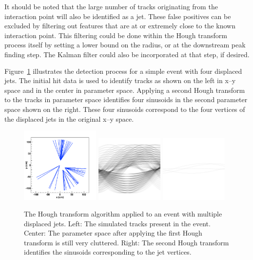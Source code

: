 \documentclass[preprint,sort&compress]{elsarticle}
\begin{document}
It should be noted that the large number of tracks originating from the interaction point will also be identified as a jet.  These false positives can be excluded by filtering out features that are at or extremely close to the known interaction point.  This filtering could be done within the Hough transform process itself by setting a lower bound on the radius, or at the downstream peak finding step. The Kalman filter could also be incorporated at that step, if desired.

Figure~\ref{fig:DisplacedJets} illustrates the detection process for a simple event with four displaced jets.  The initial hit data is used to identify tracks as shown on the left in x--y space and in the center in parameter space.  Applying a second Hough transform to the tracks in parameter space identifies four sinusoids in the second parameter space shown on the right.  These four sinusoids correspond to the four vertices of the displaced jets in the original x--y space.

\begin{figure}[!Hhtb]
\begin{center}
	\includegraphics[width=0.35\textwidth]{tracks.pdf}
	\includegraphics[width=0.30\textwidth]{accumulator.pdf}
	\includegraphics[width=0.30\textwidth]{vertex.pdf}
	\caption{The Hough transform algorithm applied to an event with multiple displaced jets. Left: The simulated
	tracks present in the event. Center: The parameter space after applying the first Hough transform is still very
	cluttered. Right: The second Hough transform identifies the sinusoids corresponding to the jet vertices.
	\label{fig:DisplacedJets}}
\end{center}
\end{figure}
\end{document}
